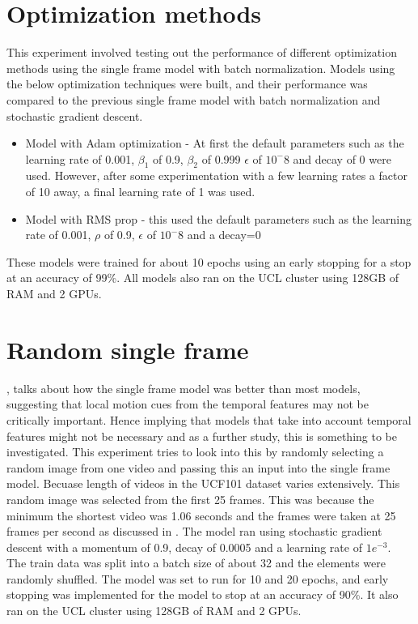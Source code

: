 \section{Optimization methods}
This experiment involved testing out the performance of different optimization methods using the single frame model with batch normalization.
 Models using the below optimization techniques were built, and their performance was compared to the previous single frame model with batch normalization and stochastic gradient descent.
\begin{itemize}
    \item Model with Adam optimization -  At first the default parameters such as the learning rate of 0.001, $\beta_1$ of 0.9, $\beta_2$ of 0.999  $\epsilon$ of $10^-8$ and decay of 0 were used. However, after some experimentation with a few learning rates a factor of 10 away, a final learning rate of 1 was used. 
    \item Model with RMS prop - this used the default parameters such as the learning rate of 0.001, $\rho$ of 0.9, $\epsilon$ of $10^-8$ and a  decay=0
\end{itemize}
These models were trained for about 10  epochs using an early stopping for a stop at an accuracy of 99\%. All models also ran on the UCL cluster using 128GB of RAM and 2 GPUs. 


\section{Random single frame}
\cite{KarpathyCVPR14},  talks about how the single frame model was better than most models, suggesting that local motion cues from the temporal features may not be critically important. Hence implying that models that take into account temporal features might not be necessary and as a further study, this is something to be investigated.
This experiment tries to look into this by randomly selecting a random image from one video and passing this an input into the single frame model. 
Becuase length of videos in the UCF101 dataset varies extensively. This random image was selected from the first 25 frames. This was because the minimum the shortest video was 1.06 seconds and the frames were taken at 25 frames per second as discussed in \citep{soomro2012ucf101}.
The model ran using stochastic gradient descent with a momentum of 0.9,  decay of 0.0005 and a learning rate of $1e^{-3}$.  
The train data was split into a batch size of about 32 and the elements were randomly shuffled.
The model was set to run for 10 and 20 epochs, and early stopping was implemented for the model to stop at an accuracy of 90\%.
It also ran on the UCL cluster using 128GB of RAM and 2 GPUs. 



